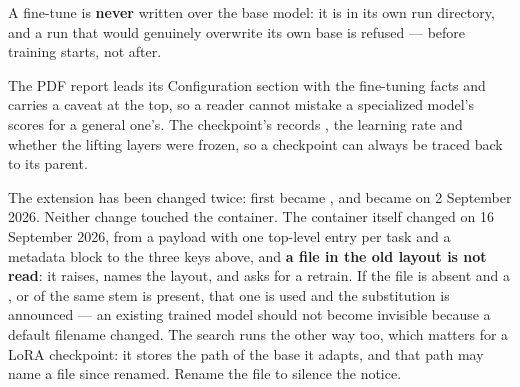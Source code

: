 A fine-tune is \textbf{never} written over the base model: it is
 in its own run directory, and a run that would
genuinely overwrite its own base is refused --- before training starts, not
after.

The PDF report leads its Configuration section with the fine-tuning facts and
carries a caveat at the top, so a reader cannot mistake a specialized model's
scores for a general one's. The checkpoint's  records
, the learning rate and whether the
lifting layers were frozen, so a checkpoint can always be traced back to its
parent.

\begin{pnote}
The extension has been changed twice:  first became , and
 became  on 2 September 2026. Neither change touched
the container. The container itself changed on 16 September 2026, from a
 payload with one top-level entry per task and a metadata
block to the three keys above, and \textbf{a file in the old layout is not
read}: it raises, names the layout, and asks for a retrain. If the
 file is
absent and a ,  or  of the same stem is present,
that one is used and the substitution is announced --- an existing trained model
should not become invisible because a default filename changed. The search runs
the other way too, which matters for a LoRA checkpoint: it stores the path of
the base it adapts, and that path may name a file since renamed. Rename the file
to silence the notice.
\end{pnote}
